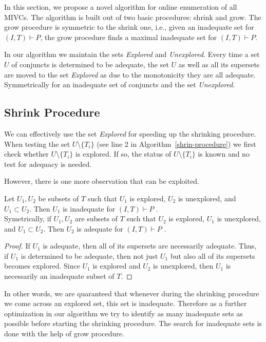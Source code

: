 In this section, we propose a novel algorithm for online enumeration of all MIVCs. The algorithm is built out of two basic procedures: shrink and grow. The grow procedure is symmetric to the shrink one, i.e., given an inadequate set for $(I, T) \vdash P$, the grow procedure finds a maximal inadequate set for $(I, T) \vdash P$.

In our algorithm we maintain the sets \textit{Explored} and  \textit{Unexplored}. Every time a set $U$ of conjuncts is determined to be adequate, the set $U$ as well as all its supersets are moved to the set  \textit{Explored} as due to the monotonicity they are all adequate. Symmetrically for an inadequate set of conjuncts and the set \textit{Unexplored}.

\subsection{Shrink Procedure}
We can effectively use the set  \textit{Explored} for speeding up the shrinking procedure. When testing the set $U \setminus \{T_i\}$ (see line 2 in Algorithm~\ref{shrin-procedure}) we first check whether  $U \setminus \{T_i\}$ is explored. If so, the status of  $U \setminus \{T_i\}$ is known and no test for adequacy is needed.

However, there is one more observation that can be exploited.


\begin{observation}
\label{observation:explored-property}
Let $U_1, U_2$ be subsets of $T$ such that $U_1$ is explored, $U_2$ is unexplored, and $U_1 \subset U_2$. Then $U_1$ is inadequate  for $(I, T) \vdash P$ .\\
Symetrically, if $U_1, U_2$ are subsets of $T$ such that $U_2$ is explored, $U_1$ is unexplored, and $U_1 \subset U_2$. Then $U_2$ is adequate  for $(I, T) \vdash P$ .
\end{observation}

\begin{proof}
If $U_1$ is adequate, then all of its supersets are necessarily adequate. Thus, if $U_1$ is determined to be adequate, then not just $U_1$ but also all of its supersets becomes explored. Since $U_1$ is explored and $U_2$ is unexplored, then $U_1$ is necessarily an inadequate subset of $T$.
\end{proof}

In other words, we are quaranteed that whenever during the shrinking procedure we come across an explored set, this set is inadequate. Therefore as a further optimization in our algorithm we try to identify as many inadequate sets as possible before starting the shrinking procedure. The search for inadequate sets is done with the help  of grow procedure.






